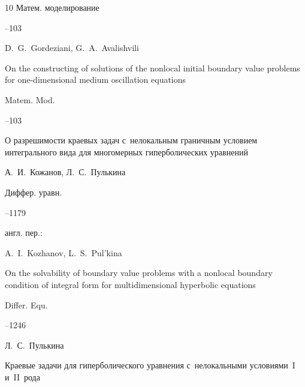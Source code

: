 \begin{thebibliography}{10}
\jour Матем. моделирование




--103




\misctransl

\by D.~G.~Gordeziani, G.~A.~Avalishvili

\paper On the constructing of solutions of the nonlocal initial boundary value problems for one-dimensional medium oscillation equations

\jour Matem. Mod.




--103




\paper  О разрешимости краевых задач с~нелокальным граничным условием интегрального вида для многомерных гиперболических уравнений

\by А.~И.~Кожанов, Л.~С.~Пулькина

\jour Диффер. уравн.




--1179

\transl англ. пер.:~

\by A.~I.~Kozhanov, L.~S.~Pul'kina

\paper On the solvability of boundary value problems with a nonlocal boundary condition of integral form for multidimensional hyperbolic equations

\jour Differ. Equ. 



--1246 







\by Л.~С.~Пулькина

\paper Краевые задачи для гиперболического уравнения с~нелокальными условиями~I и~II~рода


\end{thebibliography}
